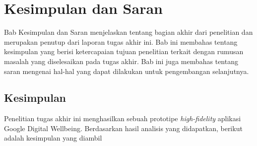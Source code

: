 \chapter{Kesimpulan dan Saran}

Bab Kesimpulan dan Saran menjelaskan tentang bagian akhir dari penelitian dan merupakan penutup dari laporan tugas akhir ini. Bab ini membahas tentang kesimpulan yang berisi ketercapaian tujuan penelitian terkait dengan rumusan masalah yang diselesaikan pada tugas akhir. Bab ini juga membahas tentang saran mengenai hal-hal yang dapat dilakukan untuk pengembangan selanjutnya.

\section{Kesimpulan}
Penelitian tugas akhir ini menghasilkan sebuah prototipe \textit{high-fidelity} aplikasi Google Digital Wellbeing. Berdasarkan hasil analisis yang didapatkan, berikut adalah kesimpulan yang diambil

